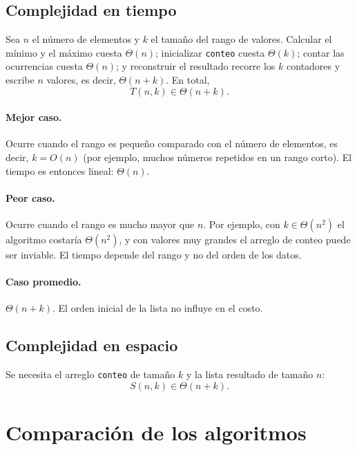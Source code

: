 \subsection{Complejidad en tiempo}

Sea $n$ el número de elementos y $k$ el tamaño del rango de valores. Calcular el mínimo y el máximo cuesta $\Theta(n)$; inicializar \texttt{conteo} cuesta $\Theta(k)$; contar las ocurrencias cuesta $\Theta(n)$; y reconstruir el resultado recorre los $k$ contadores y escribe $n$ valores, es decir, $\Theta(n+k)$. En total,
\[
  T(n, k) \in \Theta(n + k).
\]

\paragraph{Mejor caso.} Ocurre cuando el rango es pequeño comparado con el número de elementos, es decir, $k = O(n)$ (por ejemplo, muchos números repetidos en un rango corto). El tiempo es entonces lineal: $\Theta(n)$.

\paragraph{Peor caso.} Ocurre cuando el rango es mucho mayor que $n$. Por ejemplo, con $k \in \Theta(n^2)$ el algoritmo costaría $\Theta(n^2)$, y con valores muy grandes el arreglo de conteo puede ser inviable. El tiempo depende del rango y no del orden de los datos.

\paragraph{Caso promedio.} $\Theta(n + k)$. El orden inicial de la lista no influye en el costo.

\subsection{Complejidad en espacio}

Se necesita el arreglo \texttt{conteo} de tamaño $k$ y la lista resultado de tamaño $n$:
\[
  S(n, k) \in \Theta(n + k).
\]

\section{Comparación de los algoritmos}

